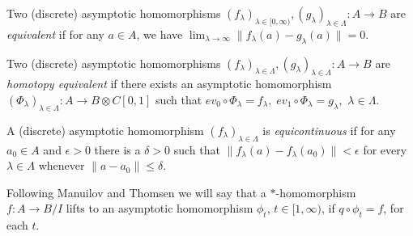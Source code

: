 \documentclass{article}%
\newtheorem{lemma}[theorem]{Lemma}
\begin{document}
Two (discrete) asymptotic homomorphisms $(f_{\lambda})_{\lambda\in [0, \infty)}, (g_{\lambda})_{\lambda\in \Lambda}: A \to B$ are {\it equivalent} if for any $a\in A$, we have $\lim_{\lambda\to \infty} \|f_{\lambda}(a)- g_{\lambda}(a)\| = 0.$

Two (discrete) asymptotic homomorphisms $(f_{\lambda})_{\lambda\in \Lambda}, (g_{\lambda})_{\lambda\in \Lambda}: A \to B$ are {\it homotopy equivalent} if there exists an asymptotic homomorphism $(\Phi_{\lambda})_{\lambda\in \Lambda}: A \to B\otimes C[0, 1]$ such that $ev_0\circ \Phi_{\lambda} = f_{\lambda}, \; ev_1\circ \Phi_{\lambda} = g_{\lambda},$ $\lambda\in \Lambda$.

A (discrete) asymptotic homomorphism $(f_{\lambda})_{\lambda\in \Lambda}$ is {\it equicontinuous} if for any $a_0\in A$ and $\epsilon >0$ there is a $\delta>0$ such that $\|f_{\lambda}(a) - f_{\lambda}(a_0)\|<\epsilon$ for every $\lambda\in \Lambda$ whenever $\|a-a_0\|\le\delta$.




\medskip

Following Manuilov and Thomsen we will say that a $\ast$-homomorphism $f: A\to B/I$ lifts to an asymptotic homomorphism  $\phi_t$, $t\in [1, \infty)$,  if $q\circ \phi_t = f$, for each $t$.

\medskip




\end{document}
